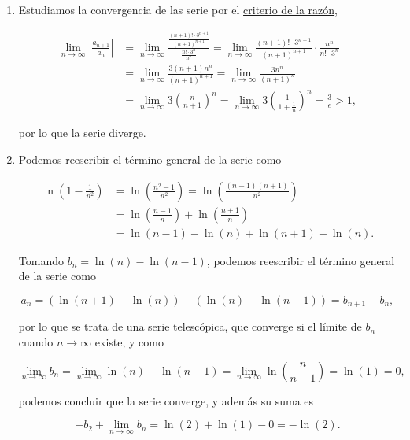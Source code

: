\documentclass[
  spanish,
  a4paper,
]{scrreport}
\theoremstyle{definition}
\theoremstyle{remark}
\begin{document}
\begin{tcolorbox}[enhanced jigsaw, arc=.35mm, bottomrule=.15mm, bottomtitle=1mm, breakable, colback=white, colbacktitle=quarto-callout-tip-color!10!white, colframe=quarto-callout-tip-color-frame, coltitle=black, left=2mm, leftrule=.75mm, opacityback=0, opacitybacktitle=0.6, rightrule=.15mm, title=\textcolor{quarto-callout-tip-color}{\faLightbulb}\hspace{0.5em}{Solución}, titlerule=0mm, toprule=.15mm, toptitle=1mm]

\begin{enumerate}
\def\labelenumi{\alph{enumi}.}
\item
  Estudiamos la convergencia de las serie por el
  \href{https://aprendeconalf.es/analisis-manual/09-series.html\#thm-criterio-razon}{criterio
  de la razón},

  \begin{align*}
  \lim_{n\to\infty}\left|\frac{a_{n+1}}{a_n}\right|
  &=\lim_{n\to\infty} \frac{\frac{(n+1)!\cdot 3^{n+1}}{(n+1)^{n+1}}}{\frac{n!\cdot 3^n}{n^n}} 
  = \lim_{n\to\infty} \frac{(n+1)!\cdot 3^{n+1}}{(n+1)^{n+1}}\cdot\frac{n^n}{n!\cdot 3^n} \\
  &= \lim_{n\to\infty} \frac{3(n+1)n^n}{(n+1)^{n+1}} 
  = \lim_{n\to\infty} \frac{3n^n}{(n+1)^n} \\
  &= \lim_{n\to\infty} 3\left(\frac{n}{n+1}\right)^n 
  = \lim_{n\to\infty} 3\left(\frac{1}{1+\frac{1}{n}}\right)^n 
  = \frac{3}{e} > 1,
  \end{align*}

  por lo que la serie diverge.
\item
  Podemos reescribir el término general de la serie como

  \begin{align*}
  \ln\left(1-\frac{1}{n^2}\right) 
  &= \ln\left(\frac{n^2-1}{n^2}\right) 
  = \ln\left(\frac{(n-1)(n+1)}{n^2}\right) \\
  &= \ln\left(\frac{n-1}{n}\right) + \ln\left(\frac{n+1}{n}\right) \\
  &= \ln(n-1) - \ln(n) + \ln(n+1) - \ln(n).
  \end{align*}

  Tomando \(b_n = \ln(n) - \ln(n-1)\), podemos reescribir el término
  general de la serie como

  \[
  a_n 
  = (\ln(n+1) - \ln(n)) - (\ln(n) - \ln(n-1)) 
  = b_{n+1} - b_n,
  \]

  por lo que se trata de una serie telescópica, que converge si el
  límite de \(b_n\) cuando \(n\to \infty\) existe, y como

  \[
  \lim_{n\to\infty} b_n = \lim_{n\to\infty} \ln(n) - \ln(n-1) = \lim_{n\to\infty} \ln\left(\frac{n}{n-1}\right) = \ln(1) = 0,
  \]

  podemos concluir que la serie converge, y además su suma es

  \[
  -b_2 + \lim_{n\to\infty} b_n
  = \ln(2)+ \ln(1) - 0
  = -\ln(2).
  \]
\end{enumerate}

\end{tcolorbox}
\end{document}
